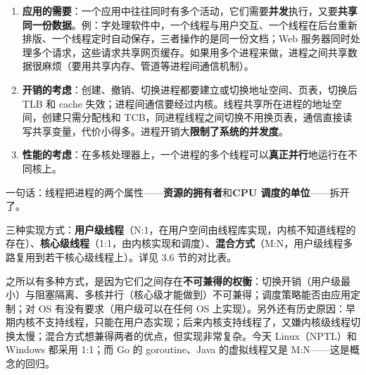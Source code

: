 \begin{enumerate}
    \item \textbf{应用的需要}：一个应用中往往同时有多个活动，它们需要\textbf{并发}执行，又要\textbf{共享同一份数据}。例：字处理软件中，一个线程与用户交互、一个线程在后台重新排版、一个线程定时自动保存，三者操作的是同一份文档；Web 服务器同时处理多个请求，这些请求共享网页缓存。如果用多个进程来做，进程之间共享数据很麻烦（要用共享内存、管道等进程间通信机制）。
    \item \textbf{开销的考虑}：创建、撤销、切换进程都要建立或切换地址空间、页表，切换后 TLB 和 cache 失效；进程间通信要经过内核。线程共享所在进程的地址空间，创建只需分配栈和 TCB，同进程线程之间切换不用换页表，通信直接读写共享变量，代价小得多。进程开销大\textbf{限制了系统的并发度}。
    \item \textbf{性能的考虑}：在多核处理器上，一个进程的多个线程可以\textbf{真正并行}地运行在不同核上。
\end{enumerate}
一句话：线程把进程的两个属性——\textbf{资源的拥有者}和\textbf{CPU 调度的单位}——拆开了。

三种实现方式：\textbf{用户级线程}（N:1，在用户空间由线程库实现，内核不知道线程的存在）、\textbf{核心级线程}（1:1，由内核实现和调度）、\textbf{混合方式}（M:N，用户级线程多路复用到若干核心级线程上）。详见 3.6 节的对比表。

之所以有多种方式，是因为它们之间存在\textbf{不可兼得的权衡}：切换开销（用户级最小）与阻塞隔离、多核并行（核心级才能做到）不可兼得；调度策略能否由应用定制；对 OS 有没有要求（用户级可以在任何 OS 上实现）。另外还有历史原因：早期内核不支持线程，只能在用户态实现；后来内核支持线程了，又嫌内核级线程切换太慢；混合方式想兼得两者的优点，但实现非常复杂。今天 Linux（NPTL）和 Windows 都采用 1:1；而 Go 的 goroutine、Java 的虚拟线程又是 M:N——这是概念的回归。

